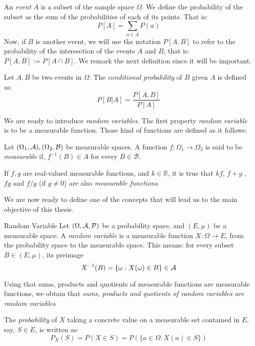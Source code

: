 An \emph{event} $A$ is a subset of the sample space $\Omega$. We define the probability of the subset as the sum of the probabilities of each of its points. That is:
$$
P[A] = \sum_{a \in A}P(a)
$$
Now, if $B$ is another event, we will use the notation $P[A,B]$ to refer to the probability of the intersection of the events $A$ and $B$, that is: $P[A,B] := P[A\cap B]$. We remark the next definition since it will be important.

\begin{ndef}
Let $A,B$ be two events in $\Omega$. The \emph{conditional probability} of $B$ given $A$ is defined as:
$$
P[B|A] = \frac{P[A,B]}{P[A]}
$$
\end{ndef}


We are ready to introduce \emph{random variables}. The first property \emph{random variable} is to be a measurable function. Those kind of functions are defined as it follows:

\begin{ndef}
Let $(\Omega_1, \mathcal{A}),(\Omega_2, \mathcal B)$ be measurable spaces. A function $f: \Omega_1 \to \Omega_2$ is said to be \emph{measurable} if, $f^{-1}(B) \in A$ for every $B \in \mathcal B$.
\end{ndef}

If $f,g$ are real-valued measurable functions, and $k \in \mathbb R$, it is true that $kf$, $f+g$ , $fg$ and $f/g$ (if $g \ne 0$) are also \emph{measurable functions}.



We are now ready to define one of the concepts that will lead us to the main objective of this thesis.

\begin{ndef}{Random Variable}
Let $(\Omega,\mathcal{A},\mathcal{P})$ be a probability space, and $(E,\mu)$ be a measurable space. 
A \emph{random variable} is a measurable function $X: \Omega \to E$, from the probability space to the measurable space. This means: for every subset $B \in (E,\mu)$, its preimage
$$
X^{-1}(B) = \{\omega : X(\omega) \in B\} \in \mathcal{A}
$$
\end{ndef}

Using that sums, products and quotients of measurable functions are measurable functions, we obtain that \emph{sums, products and quotients of random variables are random variables}

The \emph{probability} of $X$ taking a concrete value on a measurable set contained in $E$, say, $S \in E$, is written as:
$$
P_X(S) = P(X \in S) = P(\{a \in \Omega : X(a) \in S\})
$$

